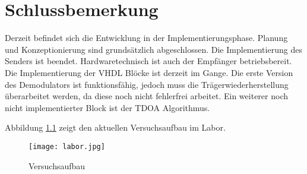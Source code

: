 \chapter{Schlussbemerkung}
\label{cha:todo}
Derzeit befindet sich die Entwicklung in der Implementierungsphase. Planung und Konzeptionierung sind grundsätzlich abgeschlossen. Die Implementierung des Senders ist beendet. Hardwaretechnisch ist auch der Empfänger betriebsbereit. Die Implementierung der VHDL Blöcke ist derzeit im Gange. Die erste Version des Demodulators ist funktionsfähig, jedoch muss die Trägerwiederherstellung überarbeitet werden, da diese noch nicht fehlerfrei arbeitet. Ein weiterer noch nicht implementierter Block ist der TDOA Algorithmus. 

Abbildung \ref{fig:lab} zeigt den aktuellen Versuchsaufbau im Labor.

\begin{figure}[H]
\centering
\texttt{[image: labor.jpg]}
\caption{Versuchsaufbau}
\label{fig:lab}
\end{figure}